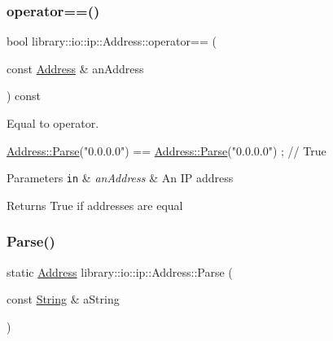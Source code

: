 \subsubsection{\texorpdfstring{operator==()}{operator==()}}
{\footnotesize\ttfamily bool library\+::io\+::ip\+::\+Address\+::operator== (\begin{DoxyParamCaption}\item[{const \hyperlink{classlibrary_1_1io_1_1ip_1_1_address}{Address} \&}]{an\+Address }\end{DoxyParamCaption}) const}



Equal to operator. 


\begin{DoxyCode}
\hyperlink{classlibrary_1_1io_1_1ip_1_1_address_af8ab0e365de3c00109b456ee94e2590b}{Address::Parse}(\textcolor{stringliteral}{"0.0.0.0"}) == \hyperlink{classlibrary_1_1io_1_1ip_1_1_address_af8ab0e365de3c00109b456ee94e2590b}{Address::Parse}(\textcolor{stringliteral}{"0.0.0.0"}) ; \textcolor{comment}{// True}
\end{DoxyCode}



\begin{DoxyParams}[1]{Parameters}
\mbox{\tt in}  & {\em an\+Address} & An IP address \\
\hline
\end{DoxyParams}
\begin{DoxyReturn}{Returns}
True if addresses are equal 
\end{DoxyReturn}
\mbox{\label{classlibrary_1_1io_1_1ip_1_1_address_af8ab0e365de3c00109b456ee94e2590b}} 
\subsubsection{\texorpdfstring{Parse()}{Parse()}}
{\footnotesize\ttfamily static \hyperlink{classlibrary_1_1io_1_1ip_1_1_address}{Address} library\+::io\+::ip\+::\+Address\+::\+Parse (\begin{DoxyParamCaption}\item[{const \hyperlink{namespacelibrary_1_1io_1_1ip_a2ac70ed8dfa9969304e09cead6a39459}{String} \&}]{a\+String }\end{DoxyParamCaption})\hspace{0.3cm}{\ttfamily [static]}}



